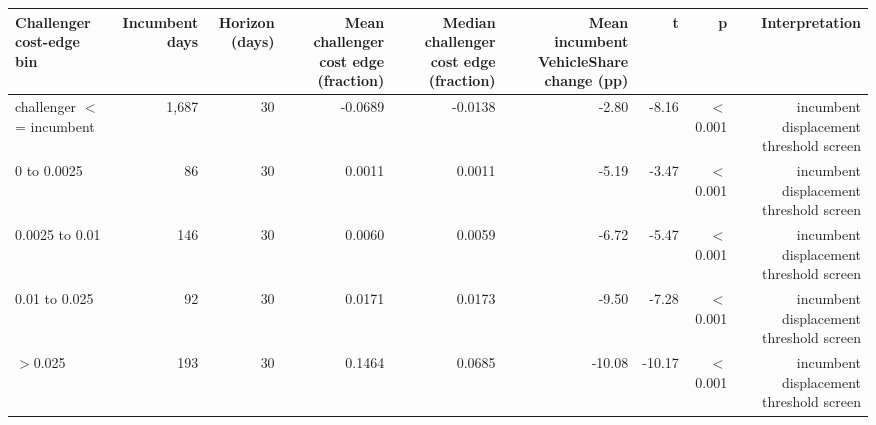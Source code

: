 \begin{tabular}{lrrrrrrrr}
\toprule
Challenger cost-edge bin & Incumbent days & Horizon (days) & Mean challenger cost edge (fraction) & Median challenger cost edge (fraction) & Mean incumbent VehicleShare change (pp) & t & p & Interpretation \\
\midrule
challenger \ensuremath{<}= incumbent & 1,687 & 30 & -0.0689 & -0.0138 & -2.80 & -8.16 & \ensuremath{<}0.001 & incumbent displacement threshold screen \\
0 to 0.0025 & 86 & 30 & 0.0011 & 0.0011 & -5.19 & -3.47 & \ensuremath{<}0.001 & incumbent displacement threshold screen \\
0.0025 to 0.01 & 146 & 30 & 0.0060 & 0.0059 & -6.72 & -5.47 & \ensuremath{<}0.001 & incumbent displacement threshold screen \\
0.01 to 0.025 & 92 & 30 & 0.0171 & 0.0173 & -9.50 & -7.28 & \ensuremath{<}0.001 & incumbent displacement threshold screen \\
\ensuremath{>}0.025 & 193 & 30 & 0.1464 & 0.0685 & -10.08 & -10.17 & \ensuremath{<}0.001 & incumbent displacement threshold screen \\
\bottomrule
\end{tabular}

